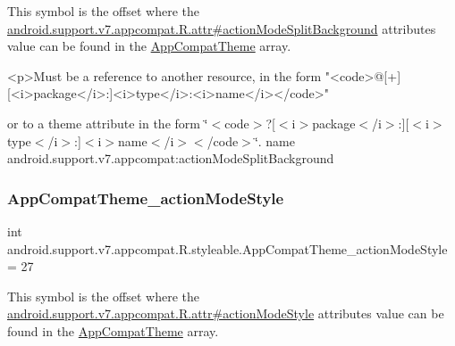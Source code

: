 This symbol is the offset where the \hyperlink{classandroid_1_1support_1_1v7_1_1appcompat_1_1R_1_1attr_a599a8a1861414f1a5724072321e93195}{android.\+support.\+v7.\+appcompat.\+R.\+attr\#action\+Mode\+Split\+Background} attribute\textquotesingle{}s value can be found in the \hyperlink{classandroid_1_1support_1_1v7_1_1appcompat_1_1R_1_1styleable_a5c42f89e8a410c323be34208d75c430b}{App\+Compat\+Theme} array.

\begin{DoxyVerb}      <p>Must be a reference to another resource, in the form "<code>@[+][<i>package</i>:]<i>type</i>:<i>name</i></code>"
\end{DoxyVerb}
 or to a theme attribute in the form \char`\"{}$<$code$>$?\mbox{[}$<$i$>$package$<$/i$>$\+:\mbox{]}\mbox{[}$<$i$>$type$<$/i$>$\+:\mbox{]}$<$i$>$name$<$/i$>$$<$/code$>$\char`\"{}.  name android.\+support.\+v7.\+appcompat\+:action\+Mode\+Split\+Background \mbox{\label{classandroid_1_1support_1_1v7_1_1appcompat_1_1R_1_1styleable_a8e56a0020ace1566c0563e99c269d0a5}} 
\subsubsection{\texorpdfstring{App\+Compat\+Theme\+\_\+action\+Mode\+Style}{AppCompatTheme\_actionModeStyle}}
{\footnotesize\ttfamily int android.\+support.\+v7.\+appcompat.\+R.\+styleable.\+App\+Compat\+Theme\+\_\+action\+Mode\+Style = 27\hspace{0.3cm}{\ttfamily [static]}}

This symbol is the offset where the \hyperlink{classandroid_1_1support_1_1v7_1_1appcompat_1_1R_1_1attr_aa62226bc0f0b851e6c4ba0e7ce6303e9}{android.\+support.\+v7.\+appcompat.\+R.\+attr\#action\+Mode\+Style} attribute\textquotesingle{}s value can be found in the \hyperlink{classandroid_1_1support_1_1v7_1_1appcompat_1_1R_1_1styleable_a5c42f89e8a410c323be34208d75c430b}{App\+Compat\+Theme} array.

